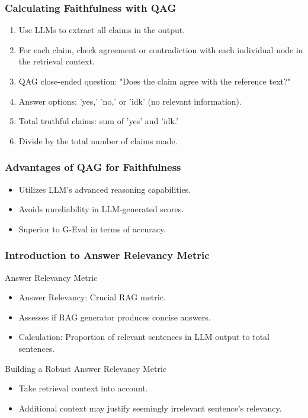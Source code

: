\begin{frame}[fragile]\frametitle{Calculating Faithfulness with QAG}
  \begin{enumerate}
    \item Use LLMs to extract all claims in the output.
    \item For each claim, check agreement or contradiction with each individual node in the retrieval context.
    \item QAG close-ended question: "Does the claim agree with the reference text?"
    \item Answer options: 'yes,' 'no,' or 'idk' (no relevant information).
    \item Total truthful claims: sum of 'yes' and 'idk.'
    \item Divide by the total number of claims made.
  \end{enumerate}
\end{frame}

\begin{frame}[fragile]\frametitle{Advantages of QAG for Faithfulness}
  \begin{itemize}
    \item Utilizes LLM's advanced reasoning capabilities.
    \item Avoids unreliability in LLM-generated scores.
    \item Superior to G-Eval in terms of accuracy.
  \end{itemize}
\end{frame}

\begin{frame}[fragile]\frametitle{Introduction to Answer Relevancy Metric}
Answer Relevancy Metric
  \begin{itemize}
    \item Answer Relevancy: Crucial RAG metric.
    \item Assesses if RAG generator produces concise answers.
    \item Calculation: Proportion of relevant sentences in LLM output to total sentences.
  \end{itemize}
  
Building a Robust Answer Relevancy Metric
  \begin{itemize}
    \item Take retrieval context into account.
    \item Additional context may justify seemingly irrelevant sentence's relevancy.
  \end{itemize}
\end{frame}


